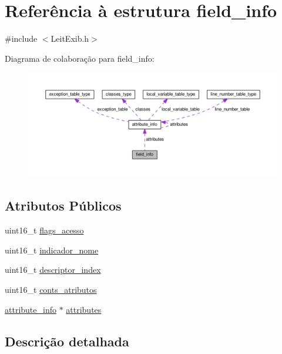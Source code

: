 \hypertarget{structfield__info}{\section{Referência à estrutura field\-\_\-info}
\label{structfield__info}
}


{\ttfamily \#include $<$Leit\-Exib.\-h$>$}



Diagrama de colaboração para field\-\_\-info\-:\nopagebreak
\begin{figure}[H]
\begin{center}
\leavevmode
\includegraphics[width=350pt]{structfield__info__coll__graph}
\end{center}
\end{figure}
\subsection*{Atributos Públicos}
\begin{DoxyCompactItemize}
\item 
uint16\-\_\-t \hyperlink{structfield__info_af4858fc71c02c24357fb6be046516331}{flags\-\_\-acesso}
\item 
uint16\-\_\-t \hyperlink{structfield__info_a15c229849e95ecf75de50a79a3760c00}{indicador\-\_\-nome}
\item 
uint16\-\_\-t \hyperlink{structfield__info_a56345eae0135047540b60ca34c91eb46}{descriptor\-\_\-index}
\item 
uint16\-\_\-t \hyperlink{structfield__info_a8da20a3727e18a7f1a7e59cedacaa80c}{conts\-\_\-atributos}
\item 
\hyperlink{structattribute__info}{attribute\-\_\-info} $\ast$ \hyperlink{structfield__info_afdda114944ae5eaae78c237f99257108}{attributes}
\end{DoxyCompactItemize}


\subsection{Descrição detalhada}


